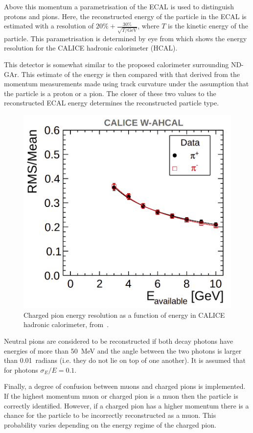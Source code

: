 Above this momentum a parametrisation of the ECAL is used to distinguish protons and pions.
Here, the reconstructed energy of the particle in the ECAL is estimated with a resolution of 
$20\% + \frac{30\%}{\sqrt{T / \si{\GeV}}}$, where $T$ is the kinetic energy of the particle.
This parametrisation is determined by eye from  which shows the energy resolution for the CALICE hadronic calorimeter (HCAL).

This detector is somewhat similar to the proposed calorimeter surrounding ND-GAr.
This estimate of the energy is then compared with that derived from the momentum measurements made using track curvature under the assumption that the particle is a proton or a pion.
The closer of these two values to the reconstructed ECAL energy determines the reconstructed particle type.

\begin{figure}[h]
	\centering
	\includegraphics[width=.5\linewidth]{files/figures/dune_ndrwt/caliceParam}
	\caption[Charged pion energy resolution as a function of energy in the CALICE HCAL.]{Charged pion energy resolution as a function of energy in CALICE hadronic calorimeter, from~\cite{hcalParam}.}
	\label{fig:caliceParam}
\end{figure}

Neutral pions are considered to be reconstructed if both decay photons have energies of more than \SI{50}{\MeV} and the angle between the two photons is larger than 0.01~radians (i.e. they do not lie on top of one another).
It is assumed that for photons $\sigma_{E}/E = 0.1$.

Finally, a degree of confusion between muons and charged pions is implemented.
If the highest momentum muon or charged pion is a muon then the particle is correctly identified.
However, if a charged pion has a higher momentum there is a chance for the particle to be incorrectly reconstructed as a muon.
This probability varies depending on the energy regime of the charged pion.

